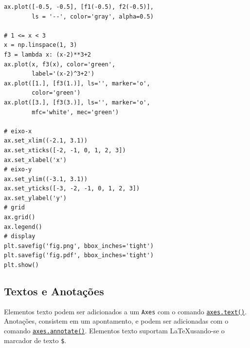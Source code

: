 \begin{ex}
\begin{lstlisting}
ax.plot([-0.5, -0.5], [f1(-0.5), f2(-0.5)],
        ls = '--', color='gray', alpha=0.5)

# 1 <= x < 3
x = np.linspace(1, 3)
f3 = lambda x: (x-2)**3+2
ax.plot(x, f3(x), color='green',
        label='(x-2)^3+2')
ax.plot([1.], [f3(1.)], ls='', marker='o',
        color='green')
ax.plot([3.], [f3(3.)], ls='', marker='o',
        mfc='white', mec='green')

# eixo-x
ax.set_xlim((-2.1, 3.1))
ax.set_xticks([-2, -1, 0, 1, 2, 3])
ax.set_xlabel('x')
# eixo-y
ax.set_ylim((-3.1, 3.1))
ax.set_yticks([-3, -2, -1, 0, 1, 2, 3])
ax.set_ylabel('y')
# grid
ax.grid()
ax.legend()
# display
plt.savefig('fig.png', bbox_inches='tight')
plt.savefig('fig.pdf', bbox_inches='tight')
plt.show()
\end{lstlisting}

\end{ex}

\subsection{Textos e Anotações}

Elementos texto podem ser adicionados a um \lstinline+Axes+ com o comando \href{https://matplotlib.org/stable/api/_as_gen/matplotlib.axes.Axes.text.html#matplotlib.axes.Axes.text}{\lstinline+axes.text()+}. Anotações, consistem em um apontamento, e podem ser adicionadas com o comando \href{https://matplotlib.org/stable/api/_as_gen/matplotlib.axes.Axes.annotate.html#matplotlib.axes.Axes.annotate}{\lstinline+axes.annotate()+}. Elementos texto suportam \LaTeX usando-se o marcador de texto \lstinline!$!.%

